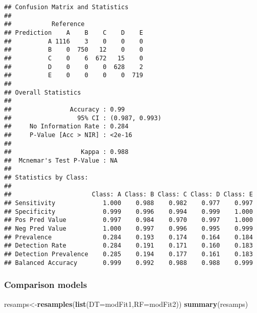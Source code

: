 \documentclass[]{article}
\newenvironment{Shaded}{\begin{snugshade}}{\end{snugshade}}
\newcommand{\KeywordTok}[1]{\textcolor[rgb]{0.13,0.29,0.53}{\textbf{{#1}}}}
\newcommand{\DataTypeTok}[1]{\textcolor[rgb]{0.13,0.29,0.53}{{#1}}}
\newcommand{\DecValTok}[1]{\textcolor[rgb]{0.00,0.00,0.81}{{#1}}}
\newcommand{\NormalTok}[1]{{#1}}
\begin{document}
\begin{verbatim}
## Confusion Matrix and Statistics
## 
##           Reference
## Prediction    A    B    C    D    E
##          A 1116    3    0    0    0
##          B    0  750   12    0    0
##          C    0    6  672   15    0
##          D    0    0    0  628    2
##          E    0    0    0    0  719
## 
## Overall Statistics
##                                         
##                Accuracy : 0.99          
##                  95% CI : (0.987, 0.993)
##     No Information Rate : 0.284         
##     P-Value [Acc > NIR] : <2e-16        
##                                         
##                   Kappa : 0.988         
##  Mcnemar's Test P-Value : NA            
## 
## Statistics by Class:
## 
##                      Class: A Class: B Class: C Class: D Class: E
## Sensitivity             1.000    0.988    0.982    0.977    0.997
## Specificity             0.999    0.996    0.994    0.999    1.000
## Pos Pred Value          0.997    0.984    0.970    0.997    1.000
## Neg Pred Value          1.000    0.997    0.996    0.995    0.999
## Prevalence              0.284    0.193    0.174    0.164    0.184
## Detection Rate          0.284    0.191    0.171    0.160    0.183
## Detection Prevalence    0.285    0.194    0.177    0.161    0.183
## Balanced Accuracy       0.999    0.992    0.988    0.988    0.999
\end{verbatim}

\begin{Shaded}
\end{Shaded}

\subsubsection{Comparison models}\label{comparison-models}

\begin{Shaded}
\begin{Highlighting}[]
\NormalTok{resamps<-}\KeywordTok{resamples}\NormalTok{(}\KeywordTok{list}\NormalTok{(}\DataTypeTok{DT=}\NormalTok{modFit1,}\DataTypeTok{RF=}\NormalTok{modFit2))}
\KeywordTok{summary}\NormalTok{(resamps)}
\end{Highlighting}
\end{Shaded}
\end{document}
